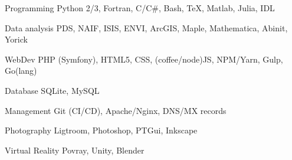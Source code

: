 
\begin{cvskills}

	\cvskill
	{Programming}
    {Python 2/3, Fortran, C/C\#, Bash, \TeX, Matlab, Julia, IDL}

	\cvskill
	{Data analysis}
    {PDS, NAIF, ISIS, ENVI, ArcGIS, Maple, Mathematica, Abinit, Yorick}

	\cvskill
    {WebDev}
    {PHP (Symfony), HTML5, CSS, (coffee/node)JS, NPM/Yarn, Gulp, Go(lang)}

	\cvskill
    {Database}
    {SQLite, MySQL}

	\cvskill
    {Management}
    {Git (CI/CD), Apache/Nginx, DNS/MX records}

	\cvskill
    {Photography}
    {Ligtroom, Photoshop, PTGui, Inkscape}

    \cvskill
    {Virtual Reality}
    {Povray, Unity, Blender}

\end{cvskills}
